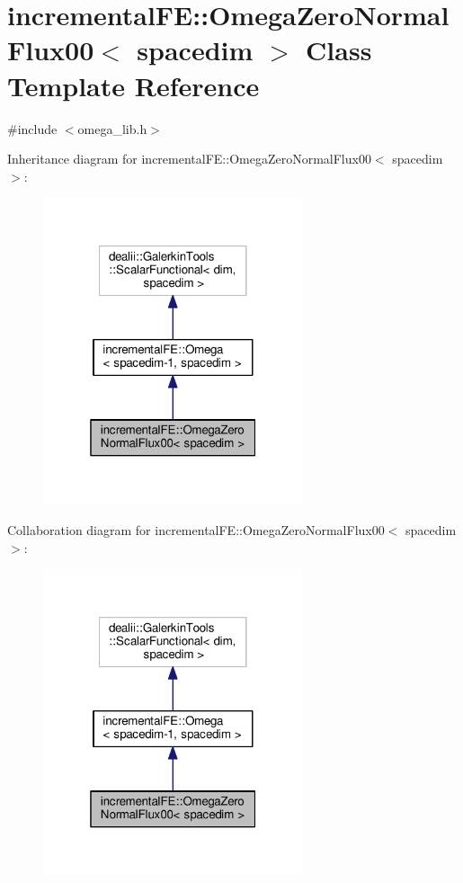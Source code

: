 \hypertarget{classincremental_f_e_1_1_omega_zero_normal_flux00}{}\section{incremental\+FE\+:\+:Omega\+Zero\+Normal\+Flux00$<$ spacedim $>$ Class Template Reference}
\label{classincremental_f_e_1_1_omega_zero_normal_flux00}


{\ttfamily \#include $<$omega\+\_\+lib.\+h$>$}



Inheritance diagram for incremental\+FE\+:\+:Omega\+Zero\+Normal\+Flux00$<$ spacedim $>$\+:\nopagebreak
\begin{figure}[H]
\begin{center}
\leavevmode
\includegraphics[width=217pt]{classincremental_f_e_1_1_omega_zero_normal_flux00__inherit__graph}
\end{center}
\end{figure}


Collaboration diagram for incremental\+FE\+:\+:Omega\+Zero\+Normal\+Flux00$<$ spacedim $>$\+:\nopagebreak
\begin{figure}[H]
\begin{center}
\leavevmode
\includegraphics[width=217pt]{classincremental_f_e_1_1_omega_zero_normal_flux00__coll__graph}
\end{center}
\end{figure}
